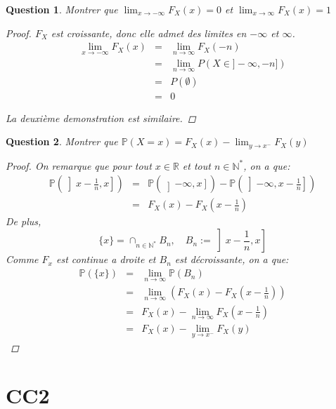 \documentclass{article}
\theoremstyle{plain}
\newtheorem{question}{Question}
\begin{document}
\begin{question}
	Montrer que $\lim_{x \to -\infty} F_X (x) = 0$ et $\lim_{x \to \infty} F_X (x) = 1$
	\begin{proof}
		$F_X$ est croissante, donc elle admet des limites en $-\infty$ et $\infty$.
		\begin{eqnarray*}
			\lim_{x \to -\infty} F_X (x) &=& \lim_{n \to \infty} F_X (-n) \\
			&=& \lim_{n \to \infty} P (X \in ]-\infty, -n]) \\
			&=& P (\emptyset) \\
			&=& 0
		\end{eqnarray*}

		La deuxième demonstration est similaire.
	\end{proof}
\end{question}



\begin{question}
	Montrer que $\mathbb{P} (X = x) = F_X (x) - \lim_{y \to x^-} F_X (y)$
	\begin{proof}
		On remarque que pour tout $x \in \mathbb{R}$ et tout $n \in \mathbb{N}^*$, on a que:
		\begin{eqnarray*}
			\mathbb{P} \left(\left] x- \frac{1}{n}, x \right]\right) &=& \mathbb{P} \left(\left] -\infty, x  \right]\right) - \mathbb{P} \left(\left] -\infty, x- \frac{1}{n} \right]\right) \\
			&=& F_X (x) - F_X (x- \frac{1}{n})
		\end{eqnarray*}
		De plus,
		$$ \{x\} = \cap_{n \in \mathbb{N}^*} B_n, \quad B_n := \left] x- \frac{1}{n}, x \right]$$
		Comme $F_x$ est continue a droite et $B_n$ est décroissante, on a que:
		\begin{eqnarray*}
			\mathbb{P} (\{x\}) &=& \lim_{n \to \infty} \mathbb{P} (B_n) \\
			&=& \lim_{n \to \infty} \left( F_X (x) - F_X (x- \frac{1}{n}) \right) \\
			&=& F_X (x) - \lim_{n \to \infty} F_X (x- \frac{1}{n}) \\
			&=& F_X (x) - \lim_{y \to x^-} F_X (y)
		\end{eqnarray*}

	\end{proof}
\end{question}

\section{CC2}
\end{document}

